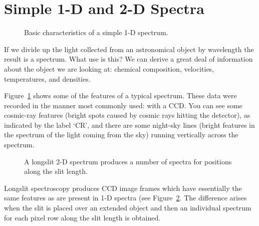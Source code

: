 \documentclass[twoside,11pt]{article}
\newcommand{\stardocinitials}  {SC}
\newcommand{\stardocnumber}    {7.2}
\newcommand{\stardocname}{\stardocinitials /\stardocnumber}
\newcommand{\htmlref}[2]{#1}
\newcommand{\xlabel}[1]{}
\newcommand{\mlabel}[1]{\xlabel{#1}\label{#1}}
\newcommand{\scspec}[2]{#1}
\newcommand{\scspec}[2]{#2}
\begin{document}
\section{\mlabel{simple_spectrum}Simple 1-D and 2-D Spectra}
\markboth{Simple 1-D and 2-D Spectra}{\stardocname}

\begin{figure}
\begin{center}
  \scspec{\leavevmode\epsfysize=105mm\epsfbox{sc7_01.eps}}
         {\leavevmode\epsfysize=136mm}

  \parbox{140mm}{
    \caption{Basic characteristics of a simple 1-D spectrum.}
    \label{fi_simple_spectrum}
  }
\end{center}
\end{figure}

If we divide up the light collected from an astronomical object by
wavelength the result is a spectrum.  What use is this?  We can derive
a great deal of information about the object we are looking at: chemical
composition, velocities, temperatures, and densities.

\scspec{Figure~\ref{fi_simple_spectrum}}{The figure above}
shows some of the features of a typical spectrum.
These data were recorded in the manner most commonly used: with a
\htmlref{CCD}{gl_ccd}.
You can see some \htmlref{cosmic-ray features}{gl_cosmic_ray}
(bright spots caused by cosmic rays hitting the detector),
as indicated by the label `CR', and
there are some night-sky lines (bright features in the spectrum of
the light coming from the sky) running vertically across the spectrum.


\begin{figure}
\begin{center}
  \scspec{\leavevmode\epsfysize=105mm\epsfbox{sc7_01b.eps}}
         {\leavevmode\epsfysize=136mm}

  \parbox{140mm}{
    \caption{A longslit 2-D spectrum produces a number of spectra for
             positions along the slit length.}
    \label{fi_twod_spectrum}
  }
\end{center}
\end{figure}

Longslit spectroscopy produces CCD image frames which have essentially
the same features as are present in 1-D spectra (see
\scspec{Figure~\ref{fi_twod_spectrum}}{The figure above}. The
difference arises when the slit is placed over an extended object and
then an individual spectrum for each pixel row along the slit length
is obtained.
\end{document}
